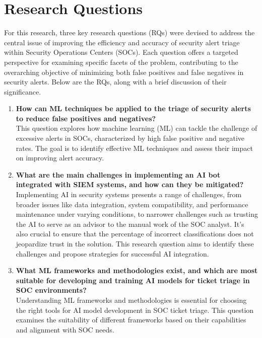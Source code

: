 \section{Research Questions}

For this research, three key research questions (RQs) were devised to address the central issue of improving the efficiency and accuracy of security alert triage within Security Operations Centers (SOCs). 
Each question offers a targeted perspective for examining specific facets of the problem, contributing to the overarching objective of minimizing both false positives and false negatives in security alerts. 
Below are the RQs, along with a brief discussion of their significance.

\begin{enumerate}
    \item \textbf{How can ML techniques be applied to the triage of security alerts to reduce false positives and negatives?} \\
    This question explores how machine learning (ML) can tackle the challenge of excessive alerts in SOCs, characterized by high false positive and negative rates. The goal is to identify effective ML techniques and assess their impact on improving alert accuracy.
    
    \item \textbf{What are the main challenges in implementing an AI bot integrated with SIEM systems, and how can they be mitigated?} \\
    Implementing AI in security systems presents a range of challenges, from broader issues like data integration, system compatibility, and performance maintenance under varying conditions, to narrower challenges such as trusting the AI to serve as an advisor to the manual work of the SOC analyst. It's also crucial to ensure that the percentage of incorrect classifications does not jeopardize trust in the solution. This research question aims to identify these challenges and propose strategies for successful AI integration.
        
    \item \textbf{What ML frameworks and methodologies exist, and which are most suitable for developing and training AI models for ticket triage in SOC environments?} \\
    Understanding ML frameworks and methodologies is essential for choosing the right tools for AI model development in SOC ticket triage. This question examines the suitability of different frameworks based on their capabilities and alignment with SOC needs.
\end{enumerate}

